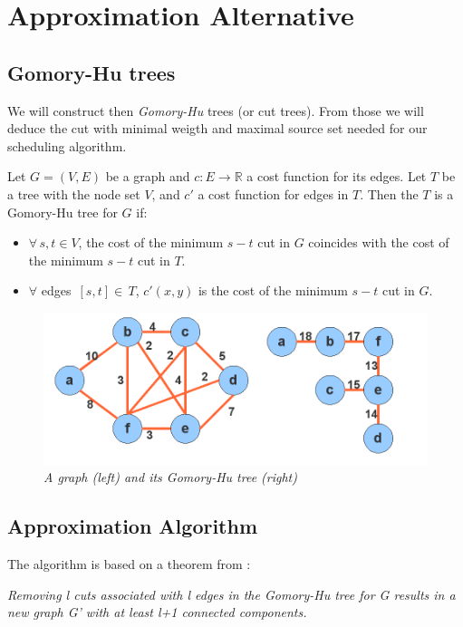 \section{Approximation Alternative}
\subsection{Gomory-Hu trees}

We will construct then \textit{Gomory-Hu} trees (or cut trees). From those we will deduce the cut with minimal weigth and
maximal source set needed for our scheduling algorithm.

Let $G=(V,E)$ be a graph and $c:E\rightarrow\mathbb{R}$ a cost function for its edges. Let $T$ be a tree with the node set $V$, and $c'$ a
cost function for edges in $T$. Then the $T$ is a Gomory-Hu tree for $G$ if:
\begin{itemize}
 \item $\forall\,s,t\in V$, the cost of the minimum $s-t$ cut in $G$ coincides with the cost of the minimum $s-t$ cut in $T$.
 \item $\forall$ edges $\,[s,t]\in\,T$, $c'(x,y)$ is the cost of the minimum $s-t$ cut in $G$.
\end{itemize}

\begin{figure}[ht]
\begin{center}
\includegraphics[scale=0.4]{static/gomory-hu.png}
\end{center}
\caption{\small \itshape{A graph (left) and its Gomory-Hu tree (right) }}
\end{figure}

\subsection{Approximation Algorithm}

The algorithm is based on a theorem from \cite{Jaco2006}:

\textit{Removing l cuts associated with l edges in the Gomory-Hu tree for G results in a new graph G'
with at least l+1 connected components.}

